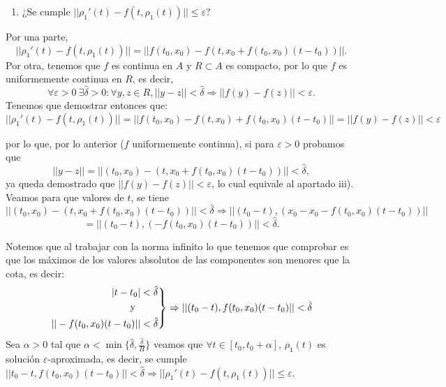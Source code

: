 \documentclass[11pt, a4paper,twoside]{article}
\makeatletter
\theoremstyle{theorem-style}  %
\renewenvironment{proof}[1][\proofname]{\par
	\pushQED{\qed}%
	\normalfont \topsep6\p@\@plus6\p@\relax
	\list{}{%
		\settowidth{\leftmargin}{\quad:\hskip\labelsep}%
		\setlength{\labelwidth}{0pt}%
		\setlength{\itemindent}{-\leftmargin}%
	}%
	\item[\hskip\labelsep\itshape#1\@addpunct{:}]\ignorespaces
}{%
	\popQED\endlist\@endpefalse
}
\theoremstyle{definition-style}
\theoremstyle{example-style}
\newenvironment{rcases}
{\left.\begin{aligned}}
	{\end{aligned}\right\rbrace}
\makeatother
\begin{document}
\begin{proof}
\begin{enumerate}[\qquad i)]
		\item ¿Se cumple $ ||\rho_1'(t)-f(t,\rho_1(t))||\leq \varepsilon $?
	\end{enumerate}
	
	Por una parte,  \[||\rho_1'(t)-f(t,\rho_1(t))||=||f(t_0,x_0)-f(t,x_0+f(t_0,x_0)(t-t_0))|| .\]
	Por otra, tenemos que $f$ es continua en $A$ y $R\subset A$ es compacto, por lo que $f$ es uniformemente continua en $R$, es decir, 
	\[\forall \varepsilon > 0 \ \exists \hat{\delta} >0 : \forall y,z \in R, ||y-z||<\hat{\delta} \Rightarrow||f(y)-f(z)||<\varepsilon .\]
	Tenemos que demostrar entonces que:  \[||\rho_1'(t)-f(t,\rho_1(t))||=||f(t_0,x_0)-f(t,x_0)+f(t_0,x_0)(t-t_0)||=||f(y)-f(z)||<\varepsilon \]
	
	por lo que, por lo anterior ($ f $ uniformemente continua), si para $ \varepsilon>0 $ probamos que 
	\[||y-z||=||(t_0,x_0)-(t, x_0+f(t_0,x_0)(t-t_0))||< \hat{\delta}, \]
	ya queda demostrado que $ ||f(y)-f(z)||<\varepsilon $, lo cual equivale al apartado iii). Veamos para que valores de $ t $, se tiene 
	\[||(t_0,x_0)-(t, x_0+f(t_0,x_0)(t-t_0))||< \hat{\delta} \Rightarrow ||(t_0-t),( x_0-x_0 -f(t_0,x_0)(t-t_0))||\]
	\[=||(t_0-t),(-f(t_0,x_0)(t-t_0))||< \hat{\delta} .\]
	
	Notemos que al trabajar con la norma infinito lo que tenemos que comprobar es que los máximos de los valores absolutos de las componentes son menores que la cota, es decir:	
	\[ \begin{rcases}
	 |t-t_0|< \hat{\delta}\\
	 \text{ y }\qquad\\
	|| -f(t_0,x_0)(t-t_0)||< \hat{\delta}
	\end{rcases} \Rightarrow ||(t_0-t), f(t_0,x_0)(t-t_0)||< \hat{\delta} \]
	Sea $ \alpha >0 $ tal que $ \alpha < \min \{ \hat{\delta}, \frac{\hat{\delta}}{H}\} $ veamos que $ \forall t \in [t_0,t_0+\alpha] $, $\rho_1(t)$ es solución $ \varepsilon $-aproximada, es decir, se cumple $ ||t_0-t,f(t_0,x_0)(t-t_0)||< \hat{\delta}\Rightarrow ||\rho_1'(t)-f(t,\rho_1(t))||\leq \varepsilon $.
	

\end{proof}
\end{document}
